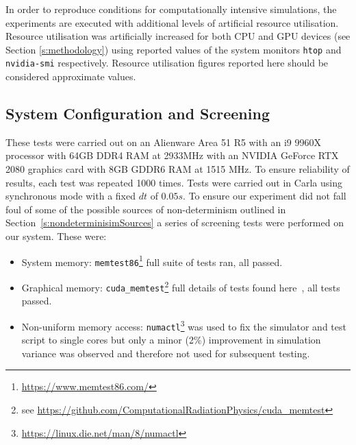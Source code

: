 \documentclass[letterpaper, 10 pt, journal, twoside]{IEEEtran}
\begin{document}
In order to reproduce conditions for computationally intensive simulations, the experiments are executed with additional levels of artificial resource utilisation. Resource utilisation was artificially increased for both CPU and GPU devices (see Section \ref{s:methodology}) using reported values of the system monitors \texttt{htop} and \texttt{nvidia-smi} respectively. Resource utilisation figures reported here should be considered approximate values.

\subsection{System Configuration and Screening}
These tests were carried out on an Alienware Area 51 R5 with an i9 9960X processor with 64GB DDR4 RAM at 2933MHz with an NVIDIA GeForce RTX 2080 graphics card with 8GB GDDR6 RAM at 1515 MHz. To ensure reliability of results, each test was repeated 1000 times. Tests were carried out in Carla using synchronous mode with a fixed $dt$ of $0.05s$. To ensure our experiment did not fall foul of some of the possible sources of non-determinism outlined in Section~\ref{s:nondeterminisimSources} a series of screening tests were performed on our system. These were:

\begin{itemize}[leftmargin=*]
    \item System memory: \texttt{memtest86}\footnote{\url{https://www.memtest86.com/}} full suite of tests ran, all passed.
    \item Graphical memory: \texttt{cuda\_memtest}\footnote{see \url{https://github.com/ComputationalRadiationPhysics/cuda_memtest}} full details of tests found here~\cite{shi2009testing}, all tests passed.
    \item Non-uniform memory access: \texttt{numactl}\footnote{\url{https://linux.die.net/man/8/numactl}} was used to fix the simulator and test script to single cores but only a minor (2\%) improvement in simulation variance was observed and therefore not used for subsequent testing.
\end{itemize}

\end{document}

